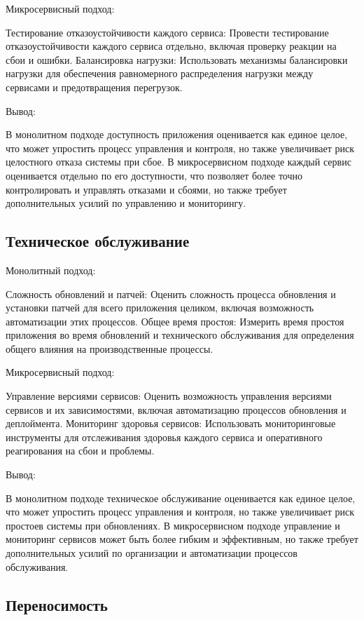 Микросервисный подход:

    Тестирование отказоустойчивости каждого сервиса: Провести тестирование отказоустойчивости каждого сервиса отдельно, включая проверку реакции на сбои и ошибки.
    Балансировка нагрузки: Использовать механизмы балансировки нагрузки для обеспечения равномерного распределения нагрузки между сервисами и предотвращения перегрузок.

Вывод:

    В монолитном подходе доступность приложения оценивается как единое целое, что может упростить процесс управления и контроля, но также увеличивает риск целостного отказа системы при сбое.
    В микросервисном подходе каждый сервис оценивается отдельно по его доступности, что позволяет более точно контролировать и управлять отказами и сбоями, но также требует дополнительных усилий по управлению и мониторингу.

\subsection{Техническое обслуживание}

Монолитный подход:

    Сложность обновлений и патчей: Оценить сложность процесса обновления и установки патчей для всего приложения целиком, включая возможность автоматизации этих процессов.
    Общее время простоя: Измерить время простоя приложения во время обновлений и технического обслуживания для определения общего влияния на производственные процессы.

Микросервисный подход:

    Управление версиями сервисов: Оценить возможность управления версиями сервисов и их зависимостями, включая автоматизацию процессов обновления и деплоймента.
    Мониторинг здоровья сервисов: Использовать мониторинговые инструменты для отслеживания здоровья каждого сервиса и оперативного реагирования на сбои и проблемы.

Вывод:

    В монолитном подходе техническое обслуживание оценивается как единое целое, что может упростить процесс управления и контроля, но также увеличивает риск простоев системы при обновлениях.
    В микросервисном подходе управление и мониторинг сервисов может быть более гибким и эффективным, но также требует дополнительных усилий по организации и автоматизации процессов обслуживания.

\subsection{Переносимость}

